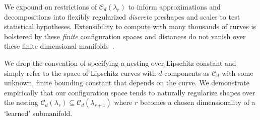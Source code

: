 \documentclass[pdflatex,iicol]{sn-jnl}%
\theoremstyle{thmstyleone}%
\theoremstyle{thmstyletwo}%
\theoremstyle{thmstylethree}%
\begin{document}
We expound on restrictions of $\mathcal{C}_d(\lambda_r)$ to inform approximations and decompositions into flexibly regularized \textit{discrete} preshapes and scales to test statistical hypotheses. Extensibility to compute with many thousands of curves is bolstered by these \emph{finite} configuration spaces and distances do not vanish over these finite dimensional manifolds~\cite{bauer2014overview}.

We drop the convention of specifying a nesting over Lipschitz constant and simply refer to the space of Lipschitz curves with $d$-components as $\mathcal{C}_d$ with some unknown, finite bounding constant that depends on the curve. We demonstrate empirically that our configuration space tends to naturally regularize shapes over the nesting $\mathcal{C}_d(\lambda_r) \subseteq \mathcal{C}_d(\lambda_{r+1})$ where $r$ becomes a chosen dimensionality of a `learned' submanifold.

\end{document}
